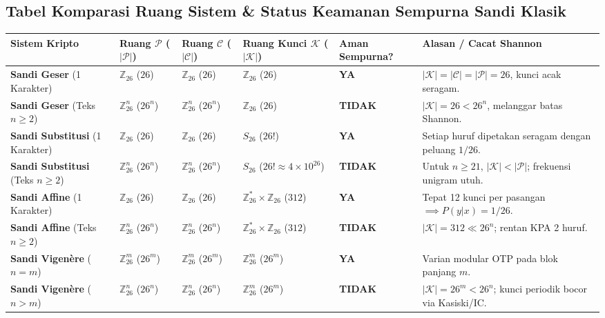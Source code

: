 \documentclass[11pt,a4paper]{article}
\begin{document}
\subsection{Tabel Komparasi Ruang Sistem \& Status Keamanan Sempurna Sandi Klasik}
\begin{table}[H]
\centering
\small
\begin{tabular}{p{3.2cm} p{2.2cm} p{2.2cm} p{3.2cm} p{2.4cm} p{2.8cm}}
\toprule
\textbf{Sistem Kripto} & \textbf{Ruang $\mathcal{P}$ ($|\mathcal{P}|$)} & \textbf{Ruang $\mathcal{C}$ ($|\mathcal{C}|$)} & \textbf{Ruang Kunci $\mathcal{K}$ ($|\mathcal{K}|$)} & \textbf{Aman Sempurna?} & \textbf{Alasan / Cacat Shannon} \\
\midrule
\textbf{Sandi Geser} (1 Karakter) & $\mathbb{Z}_{26}$ ($26$) & $\mathbb{Z}_{26}$ ($26$) & $\mathbb{Z}_{26}$ ($26$) & \textbf{YA} & $|\mathcal{K}|=|\mathcal{C}|=|\mathcal{P}|=26$, kunci acak seragam. \\
\midrule
\textbf{Sandi Geser} (Teks $n \ge 2$) & $\mathbb{Z}_{26}^n$ ($26^n$) & $\mathbb{Z}_{26}^n$ ($26^n$) & $\mathbb{Z}_{26}$ ($26$) & \textbf{TIDAK} & $|\mathcal{K}| = 26 < 26^n$, melanggar batas Shannon. \\
\midrule
\textbf{Sandi Substitusi} (1 Karakter) & $\mathbb{Z}_{26}$ ($26$) & $\mathbb{Z}_{26}$ ($26$) & $S_{26}$ ($26!$) & \textbf{YA} & Setiap huruf dipetakan seragam dengan peluang $1/26$. \\
\midrule
\textbf{Sandi Substitusi} (Teks $n \ge 2$) & $\mathbb{Z}_{26}^n$ ($26^n$) & $\mathbb{Z}_{26}^n$ ($26^n$) & $S_{26}$ ($26! \approx 4 \times 10^{26}$) & \textbf{TIDAK} & Untuk $n \ge 21$, $|\mathcal{K}| < |\mathcal{P}|$; frekuensi unigram utuh. \\
\midrule
\textbf{Sandi Affine} (1 Karakter) & $\mathbb{Z}_{26}$ ($26$) & $\mathbb{Z}_{26}$ ($26$) & $\mathbb{Z}_{26}^* \times \mathbb{Z}_{26}$ ($312$) & \textbf{YA} & Tepat 12 kunci per pasangan $\implies P(y|x) = 1/26$. \\
\midrule
\textbf{Sandi Affine} (Teks $n \ge 2$) & $\mathbb{Z}_{26}^n$ ($26^n$) & $\mathbb{Z}_{26}^n$ ($26^n$) & $\mathbb{Z}_{26}^* \times \mathbb{Z}_{26}$ ($312$) & \textbf{TIDAK} & $|\mathcal{K}| = 312 \ll 26^n$; rentan KPA 2 huruf. \\
\midrule
\textbf{Sandi Vigen\`ere} ($n = m$) & $\mathbb{Z}_{26}^m$ ($26^m$) & $\mathbb{Z}_{26}^m$ ($26^m$) & $\mathbb{Z}_{26}^m$ ($26^m$) & \textbf{YA} & Varian modular OTP pada blok panjang $m$. \\
\midrule
\textbf{Sandi Vigen\`ere} ($n > m$) & $\mathbb{Z}_{26}^n$ ($26^n$) & $\mathbb{Z}_{26}^n$ ($26^n$) & $\mathbb{Z}_{26}^m$ ($26^m$) & \textbf{TIDAK} & $|\mathcal{K}| = 26^m < 26^n$; kunci periodik bocor via Kasiski/IC. \\

\end{tabular}
\end{table}
\end{document}
